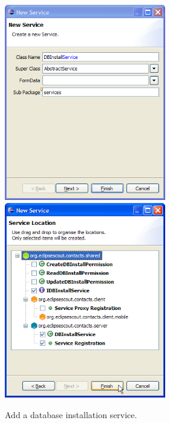 \documentclass[a4paper,10pt,twoside]{book}
\begin{document}
\begin{figure}
\includegraphics[width=7cm]{new_service_dbinstall_1.png} \hspace{5mm}
\includegraphics[width=7cm]{new_service_dbinstall_2.png} 
\caption{Add a database installation service. }
\end{figure}
\end{document}
